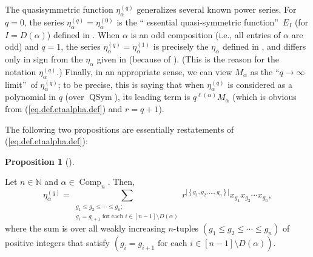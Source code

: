 \documentclass[numbers=enddot,12pt,final,onecolumn,notitlepage]{scrartcl}%
\theoremstyle{definition}
\newtheorem{prop}[theo]{Proposition}
\newenvironment{proposition}[1][]
{\begin{prop}[#1]\begin{leftbar}}
{\end{leftbar}\end{prop}}
\let\sumnonlimits\sum
\renewcommand{\sum}{\sumnonlimits\limits}
\begin{document}
The quasisymmetric function $\eta_{\alpha}^{\left(  q\right)  }$ generalizes
several known power series. For $q=0$, the series $\eta_{\alpha}^{\left(
q\right)  }=\eta_{\alpha}^{\left(  0\right)  }$ is the \textquotedblleft
essential quasi-symmetric function\textquotedblright\ $E_{I}$ (for $I=D\left(
\alpha\right)  $) defined in \cite[(8)]{Hoffma15}. When $\alpha$ is an odd
composition (i.e., all entries of $\alpha$ are odd) and $q=1$, the series
$\eta_{\alpha}^{\left(  q\right)  }=\eta_{\alpha}^{\left(  1\right)  }$ is
precisely the $\eta_{\alpha}$ defined in \cite[(6.1)]{AgBeSo14}, and differs
only in sign from the $\eta_{\alpha}$ given in \cite[(2.1)]{Hsiao07} (because
of \cite[Proposition 2.1]{Hsiao07}). (This is the reason for the notation
$\eta_{\alpha}^{\left(  q\right)  }$.) Finally, in an appropriate sense, we
can view $M_{\alpha}$ as the \textquotedblleft$q\rightarrow\infty$
limit\textquotedblright\ of $\eta_{\alpha}^{\left(  q\right)  }$; to be
precise, this is saying that when $\eta_{\alpha}^{\left(  q\right)  }$ is
considered as a polynomial in $q$ (over $\operatorname*{QSym}$), its leading
term is $q^{\ell\left(  \alpha\right)  }M_{\alpha}$ (which is obvious from
(\ref{eq.def.etaalpha.def}) and $r=q+1$).

The following two propositions are essentially restatements of
(\ref{eq.def.etaalpha.def}):

\begin{proposition}
\label{prop.eta.through-x}Let $n\in\mathbb{N}$ and $\alpha\in
\operatorname*{Comp}\nolimits_{n}$. Then,%
\begin{equation}
\eta_{\alpha}^{\left(  q\right)  }=\sum_{\substack{g_{1}\leq g_{2}\leq
\cdots\leq g_{n};\\g_{i}=g_{i+1}\text{ for each }i\in\left[  n-1\right]
\setminus D\left(  \alpha\right)  }}r^{\left\vert \left\{  g_{1},g_{2}%
,\ldots,g_{n}\right\}  \right\vert }x_{g_{1}}x_{g_{2}}\cdots x_{g_{n}},
\label{eq.prop.eta.through-x.eq}%
\end{equation}
where the sum is over all weakly increasing $n$-tuples $\left(  g_{1}\leq
g_{2}\leq\cdots\leq g_{n}\right)  $ of positive integers that satisfy $\left(
g_{i}=g_{i+1}\text{ for each }i\in\left[  n-1\right]  \setminus D\left(
\alpha\right)  \right)  $.
\end{proposition}
\end{document}
